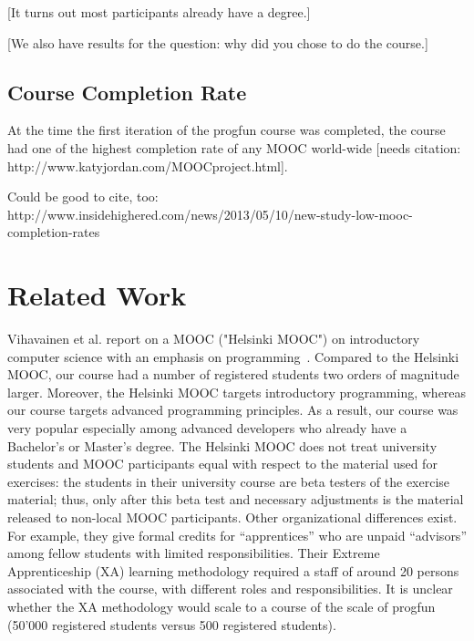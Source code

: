 \documentclass{sig-alternate}
\begin{document}
[It turns out most participants already have a degree.]

[We also have results for the question: why did you chose to do the course.]

\subsection{Course Completion Rate}

At the time the first iteration of the progfun course was completed, the
course had one of the highest completion rate of any MOOC world-wide [needs
citation: http://www.katyjordan.com/MOOCproject.html].

Could be good to cite, too:
http://www.insidehighered.com/news/2013/05/10/new-study-low-mooc-completion-rates

\section{Related Work}

Vihavainen et al. report on a MOOC ("Helsinki MOOC") on introductory computer
science with an emphasis on programming~\cite{VihavainenLK12}. Compared to the
Helsinki MOOC, our course had a number of registered students two orders of
magnitude larger. Moreover, the Helsinki MOOC targets introductory
programming, whereas our course targets advanced programming principles. As a
result, our course was very popular especially among advanced developers who
already have a Bachelor's or Master's degree. The Helsinki MOOC does not treat
university students and MOOC participants equal with respect to the material
used for exercises: the students in their university course are beta testers
of the exercise material; thus, only after this beta test and necessary
adjustments is the material released to non-local MOOC participants. Other
organizational differences exist. For example, they give formal credits for
``apprentices'' who are unpaid ``advisors'' among fellow students with limited
responsibilities. Their Extreme Apprenticeship (XA) learning methodology
required a staff of around 20 persons associated with the course, with
different roles and responsibilities. It is unclear whether the XA methodology
would scale to a course of the scale of progfun (50'000 registered students
versus 500 registered students).


%

%
%
\end{document}
